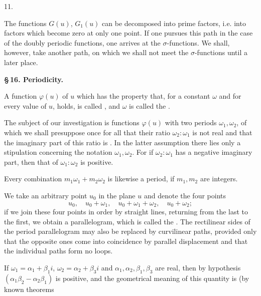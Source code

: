 
11. 

The functions $G(u)$, $G_1(u)$ can be decomposed into prime factors, i.e. into factors which become zero at only one point. If one pursues this path in the case of the doubly periodic functions, one arrives at the  $\sigma$-functions. We shall, however, take another path, on which we shall not meet the $\sigma$-functions until a later place.

\begin{center}
\textbf{\S\,16. Periodicity.}
\end{center}

A function $\varphi(u)$ of $u$ which has the property that, for a constant $\omega$ and for every value of $u$,
holds, is called , and $\omega$ is called the .

The subject of our investigation is functions $\varphi(u)$ with two periods $\omega_1, \omega_2$, of which we shall presuppose once for all that their ratio $\omega_2:\omega_1$ is not real and that the imaginary part of this ratio is . In the latter assumption there lies only a stipulation concerning the notation $\omega_1, \omega_2$. For if $\omega_2:\omega_1$ has a negative imaginary part, then that of $\omega_1:\omega_2$ is positive.

Every combination $m_1\omega_1 + m_2\omega_2$ is likewise a period, if $m_1, m_2$ are integers.

We take an arbitrary point $u_0$ in the plane $u$ and denote the four points
\[
u_0, \quad u_0 + \omega_1, \quad u_0 + \omega_1 + \omega_2, \quad u_0 + \omega_2;
\]
if we join these four points in order by straight lines, returning from the last to the first, we obtain a parallelogram, which is called the . The rectilinear sides of the period parallelogram may also be replaced by curvilinear paths, provided only that the opposite ones come into coincidence by parallel displacement and that the individual paths form no loops.

If $\omega_1 = \alpha_1 + \beta_1 i$, $\omega_2 = \alpha_2 + \beta_3 i$ and $\alpha_1, \alpha_2, \beta_1, \beta_3$ are real, %
then by hypothesis $(\alpha_1\beta_2 - \alpha_2\beta_1)$ is positive, and the geometrical meaning of this quantity is (by known theorems
